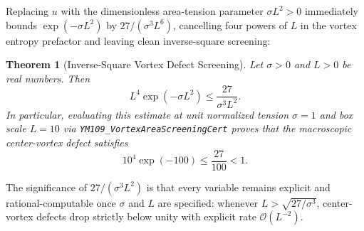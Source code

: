 \documentclass[11pt,a4paper]{article}
\newtheorem{theorem}{Theorem}[section]
\begin{document}
Replacing $u$ with the dimensionless area-tension parameter $\sigma L^2 > 0$ immediately bounds $\exp(-\sigma L^2)$ by $27 / (\sigma^3 L^6)$, cancelling four powers of $L$ in the vortex entropy prefactor and leaving clean inverse-square screening:

\begin{theorem}[Inverse-Square Vortex Defect Screening]
Let $\sigma > 0$ and $L > 0$ be real numbers. Then
\begin{equation}
L^4 \exp(-\sigma L^2) \le \frac{27}{\sigma^3 L^2}.
\end{equation}
In particular, evaluating this estimate at unit normalized tension $\sigma = 1$ and box scale $L = 10$ via \texttt{YM109\_\-VortexAreaScreeningCert} proves that the macroscopic center-vortex defect satisfies
\begin{equation}
10^4 \exp(-100) \le \frac{27}{100} < 1.
\end{equation}
\end{theorem}

The significance of $27 / (\sigma^3 L^2)$ is that every variable remains explicit and rational-computable once $\sigma$ and $L$ are specified: whenever $L > \sqrt{27 / \sigma^3}$, center-vortex defects drop strictly below unity with explicit rate $\mathcal{O}(L^{-2})$.
\end{document}
